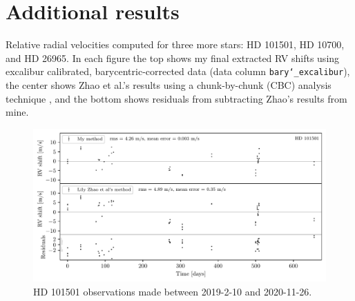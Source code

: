 % 
% 
\newpage
\section{Additional results}\label{appendix:results}

\small{Relative radial velocities computed for three more stars: HD 101501, HD 10700, and HD 26965. In each figure the top shows my final extracted RV shifts using excalibur calibrated, barycentric-corrected data (data column \texttt{bary\char`_excalibur}), the center shows Zhao et al.'s results using a chunk-by-chunk (CBC) analysis technique \cite{yale_data}, and the bottom shows residuals from subtracting Zhao's results from mine. }

\begin{figure}%
    \begin{wide}  
    \includegraphics[width=\textwidth]{figures/HD101501_barycentric_rv_vs_lily.pdf}
    \caption{HD 101501 observations made between 2019-2-10 and 2020-11-26.}
    \label{fig:HD101501_rvs}
\end{wide}
\end{figure}

\vspace{-0.75cm}

